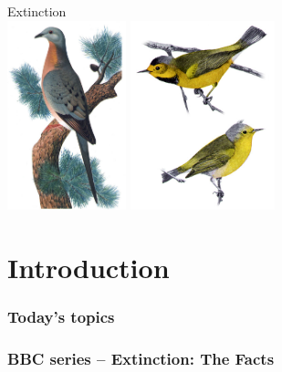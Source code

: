 \documentclass[color=usenames,dvipsnames]{beamer}\usepackage[]{graphicx}\usepackage[]{color}
\begin{document}
\begin{frame}[plain]
  \begin{center}
    {\Huge Extinction} \\
    \vfill
    \includegraphics[height=5.5cm,keepaspectratio]{figs/passenger-pigeon} \hspace{0.5cm}
    \includegraphics[height=5.5cm,keepaspectratio]{figs/Vermivora_bachmanii} %
  \end{center}
\end{frame}




\section{Introduction}


\begin{frame}[plain]
  \frametitle{Today's topics}
  \tableofcontents%
\end{frame}


\begin{frame}
  \frametitle{BBC series -- Extinction: The Facts}
\end{frame}
\end{document}
